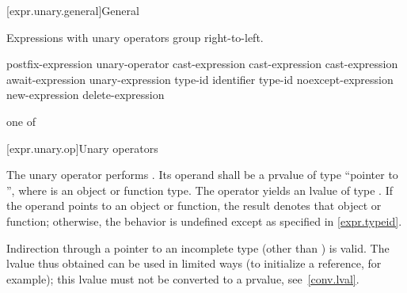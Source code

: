 [expr.unary.general]{General}

\pnum
{}%
Expressions with unary operators group right-to-left.

%
%
%
%
%
\begin{bnf}
\br
    postfix-expression\br
    unary-operator cast-expression\br
    \terminal{++} cast-expression\br
    \terminal{--} cast-expression\br
    await-expression\br
     unary-expression\br
     \terminal{(} type-id \terminal{)}\br
      \terminal{(} identifier \terminal{)}\br
     \terminal{(} type-id \terminal{)}\br
    noexcept-expression\br
    new-expression\br
    delete-expression
\end{bnf}

%
%
%
%
%
%
%
%
%
%
%
%
%
%
%
\begin{bnf}
 \textnormal{one of}\br
    \terminal{*  \&  +  -  !  \~}
\end{bnf}

[expr.unary.op]{Unary operators}

\pnum
{}%
%
The unary \tcode{*} operator performs .
%
Its operand shall be a prvalue of type ``pointer to '',
where  is an object or function type.
The operator yields an lvalue of type .
If the operand points to an object or function,
the result denotes that object or function;
otherwise, the behavior is undefined except as specified in \ref{expr.typeid}.
\begin{note}
%
Indirection through a pointer to an incomplete type (other than
\cv{} ) is valid. The lvalue thus obtained can be
used in limited ways (to initialize a reference, for example); this
lvalue must not be converted to a prvalue, see~\ref{conv.lval}.
\end{note}

